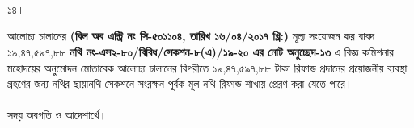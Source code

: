 \documentclass[12pt]{article}
\begin{document}
\\
\\
\\
\begin{minipage}[t]{0.05\linewidth}
১৪।
\end{minipage}
\begin{minipage}[t]{1\linewidth}
আলোচ্য চালানের
\textbf{(বিল অব এন্ট্রি নং সি-৫০১১০৪, তারিখ ১৬/০৪/২০১৭ খ্রি:)}
মূল্য সংযোজন কর বাবদ
১৯,৪৭,৫৯৭,৮৮
\textbf{নথি নং-এস২-৮০/বিবিধ/সেকশন-৮(এ)/১৯-২০
এর নোট অনুচ্ছেদ-১৩} এ বিজ্ঞ কমিশনার মহোদয়ের
অনুমোদন মোতাবেক আলোচ্য চালানের
বিপরীতে
১৯,৪৭,৫৯৭,৮৮ টাকা
রিফান্ড প্রদানের প্রয়োজনীয় ব্যবস্থা গ্রহণের জন্য
নথির ছায়ানথি সেকশনে সংরক্ষন পূর্বক
মূল নথি রিফান্ড শাখায় প্রেরণ করা যেতে পারে।
\\
\\
সদয় অবগতি ও আদেশার্থে।
\end{minipage}

\thispagestyle{laststyle}
\end{document}
